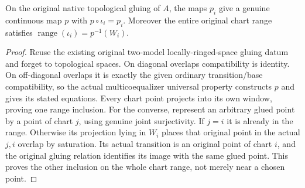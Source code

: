 \begin{lemma}
\label{hir:disjoint-analytic-saturated-glued-projection}
\leanok
On the original native topological gluing of $A$, the maps $p_i$ give a genuine
continuous map $p$ with $p\circ\iota_i=p_i$. Moreover the entire original chart
range satisfies $\operatorname{range}(\iota_i)=p^{-1}(W_i)$.
\end{lemma}
\begin{proof}
Reuse the existing original two-model locally-ringed-space gluing datum and
forget to topological spaces. On diagonal overlaps compatibility is identity.
On off-diagonal overlaps it is exactly the given ordinary transition/base
compatibility, so the actual multicoequalizer universal property constructs
$p$ and gives its stated equations. Every chart point projects into its own
window, proving one range inclusion. For the converse, represent an arbitrary
glued point by a point of chart $j$, using genuine joint surjectivity. If
$j=i$ it is already in the range. Otherwise its projection lying in $W_i$
places that original point in the actual $j,i$ overlap by saturation. Its
actual transition is an original point of chart $i$, and the original gluing
relation identifies its image with the same glued point. This proves the
other inclusion on the whole chart range, not merely near a chosen point.
\end{proof}

